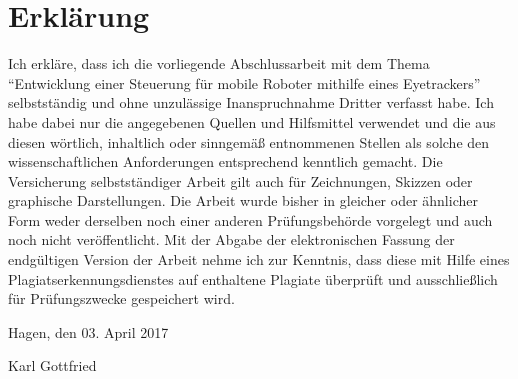 \cleardoublepage
\chapter*{Erklärung}
\normalsize
Ich erkläre, dass ich die vorliegende Abschlussarbeit mit dem Thema 
\enquote{Entwicklung einer Steuerung für mobile Roboter mithilfe eines Eyetrackers} selbstständig und ohne unzulässige Inanspruchnahme
Dritter verfasst habe. Ich habe dabei nur die angegebenen Quellen und
Hilfsmittel verwendet und die aus diesen wörtlich, inhaltlich oder
sinngemäß entnommenen Stellen als solche den wissenschaftlichen
Anforderungen entsprechend kenntlich gemacht. Die Versicherung
selbstständiger Arbeit gilt auch für Zeichnungen, Skizzen oder
graphische Darstellungen. Die Arbeit wurde bisher in gleicher oder
ähnlicher Form weder derselben noch einer anderen Prüfungsbehörde
vorgelegt und auch noch nicht veröffentlicht. Mit der Abgabe der
elektronischen Fassung der endgültigen Version der Arbeit nehme ich 
zur Kenntnis, dass diese mit Hilfe eines Plagiatserkennungsdienstes 
auf enthaltene Plagiate überprüft und ausschließlich für 
Prüfungszwecke gespeichert wird.

\vspace*{1cm}

\noindent{}Hagen, den 03. April 2017

\vspace*{3cm}


\noindent{}Karl Gottfried
